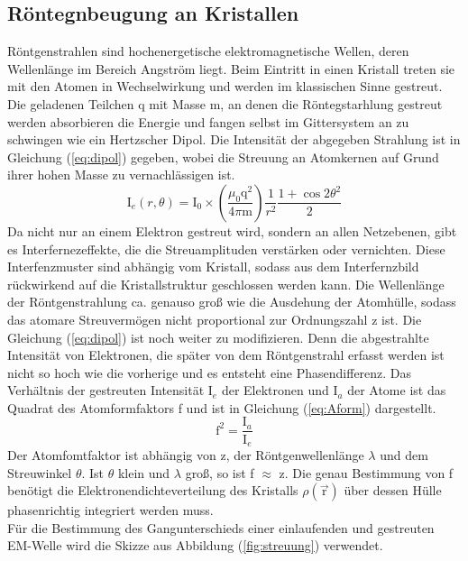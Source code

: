 \subsection{Röntegnbeugung an Kristallen}
Röntgenstrahlen sind hochenergetische elektromagnetische Wellen, deren Wellenlänge im Bereich Angström liegt. 
Beim Eintritt in einen Kristall treten sie mit den Atomen in Wechselwirkung und werden im klassischen Sinne gestreut.
Die geladenen Teilchen q mit Masse m, an denen die Röntegstarhlung gestreut werden absorbieren die Energie und fangen selbst im Gittersystem an zu schwingen wie ein Hertzscher Dipol.
Die Intensität der abgegeben Strahlung ist in Gleichung (\ref{eq:dipol}) gegeben, wobei die Streuung an Atomkernen auf Grund ihrer hohen Masse zu vernachlässigen ist.
\begin{equation}
\text{I}_e(r,\theta) = \text{I}_0\times \left(\frac{\mu_0 \text{q}^2}{4 \pi \text{m}}\right) \frac{1}{r^2} \frac{1+\cos{2\theta}^2}{2}
\label{eq:dipol}
\end{equation}
Da nicht nur an einem Elektron gestreut wird, sondern an allen Netzebenen, gibt es Interfernezeffekte, die die Streuamplituden verstärken oder vernichten.
Diese Interfenzmuster sind abhängig vom Kristall, sodass aus dem Interfernzbild rückwirkend auf die Kristallstruktur geschlossen werden kann.
Die Wellenlänge der Röntgenstrahlung ca. genauso groß wie die Ausdehung der Atomhülle, sodass das atomare Streuvermögen nicht proportional zur Ordnungszahl z ist.
Die Gleichung (\ref{eq:dipol}) ist noch weiter zu modifizieren.
Denn die abgestrahlte Intensität von Elektronen, die später von dem Röntgenstrahl erfasst werden ist nicht so hoch wie die vorherige und es entsteht eine Phasendifferenz.
Das Verhältnis der gestreuten Intensität I$_e$ der Elektronen und I$_a$ der Atome ist das Quadrat des Atomformfaktors f und ist in Gleichung (\ref{eq:Aform}) dargestellt.
\begin{equation}
\text{f}^2 = \frac{\text{I}_a}{\text{I}_e}
\label{eq:Aform}
\end{equation}
Der Atomfomtfaktor ist abhängig von z, der Röntgenwellenlänge $\lambda$ und dem Streuwinkel $\theta$. 
Ist $\theta$ klein und $\lambda$ groß, so ist f $\approx$ z.
Die genau Bestimmung von f benötigt die Elektronendichteverteilung des Kristalls $\rho(\vec{\text{r}})$ über dessen Hülle phasenrichtig integriert werden muss.\\
Für die Bestimmung des Gangunterschieds einer einlaufenden und gestreuten EM-Welle wird die Skizze aus Abbildung (\ref{fig:streuung}) verwendet.
